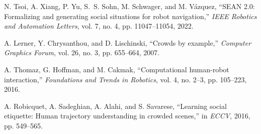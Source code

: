 \documentclass[12pt,a4paper,oneside]{book}
\begin{document}
\begin{enumerate}[label={[\arabic*]}, leftmargin=*]
\item \label{Tsoi2022} N. Tsoi, A. Xiang, P. Yu, S.~S. Sohn, M. Schwager, and M. Vázquez, ``SEAN 2.0: Formalizing and generating social situations for robot navigation,'' \emph{IEEE Robotics and Automation Letters}, vol. 7, no. 4, pp. 11047--11054, 2022.

\item \label{Lerner2007} A. Lerner, Y. Chrysanthou, and D. Lischinski, ``Crowds by example,'' \emph{Computer Graphics Forum}, vol. 26, no. 3, pp. 655--664, 2007.

\item \label{ThomazLeite2016} A. Thomaz, G. Hoffman, and M. Cakmak, ``Computational human-robot interaction,'' \emph{Foundations and Trends in Robotics}, vol. 4, no. 2--3, pp. 105--223, 2016.

\item \label{Robicquet2016} A. Robicquet, A. Sadeghian, A. Alahi, and S. Savarese, ``Learning social etiquette: Human trajectory understanding in crowded scenes,'' in \emph{ECCV}, 2016, pp. 549--565.

\end{enumerate}
\end{document}
